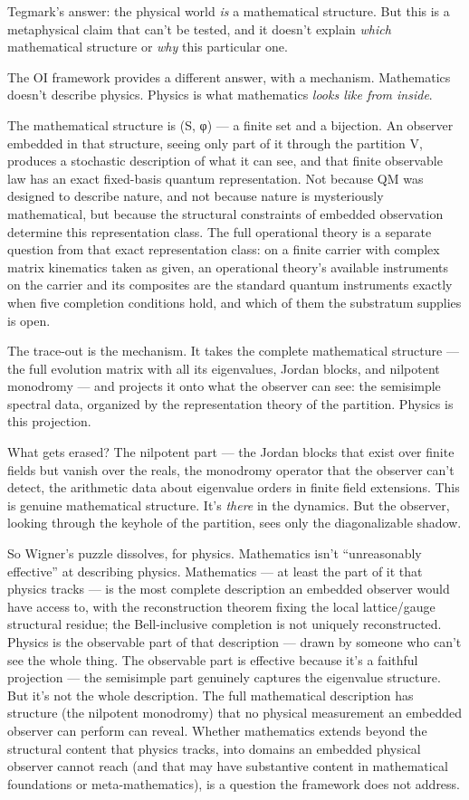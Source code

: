\documentclass[
]{article}
\begin{document}
Tegmark's answer: the physical world \emph{is} a mathematical structure.
But this is a metaphysical claim that can't be tested, and it doesn't
explain \emph{which} mathematical structure or \emph{why} this
particular one.

The OI framework provides a different answer, with a mechanism.
Mathematics doesn't describe physics. Physics is what mathematics
\emph{looks like from inside}.

The mathematical structure is (S, φ) --- a finite set and a bijection.
An observer embedded in that structure, seeing only part of it through
the partition V, produces a stochastic description of what it can see,
and that finite observable law has an exact fixed-basis quantum
representation. Not because QM was designed to describe nature, and not
because nature is mysteriously mathematical, but because the structural
constraints of embedded observation determine this representation class.
The full operational theory is a separate question from that exact
representation class: on a finite carrier with complex matrix kinematics
taken as given, an operational theory's available instruments on the
carrier and its composites are the standard quantum instruments exactly
when five completion conditions hold, and which of them the substratum
supplies is open.

The trace-out is the mechanism. It takes the complete mathematical
structure --- the full evolution matrix with all its eigenvalues, Jordan
blocks, and nilpotent monodromy --- and projects it onto what the
observer can see: the semisimple spectral data, organized by the
representation theory of the partition. Physics is this projection.

What gets erased? The nilpotent part --- the Jordan blocks that exist
over finite fields but vanish over the reals, the monodromy operator
that the observer can't detect, the arithmetic data about eigenvalue
orders in finite field extensions. This is genuine mathematical
structure. It's \emph{there} in the dynamics. But the observer, looking
through the keyhole of the partition, sees only the diagonalizable
shadow.

So Wigner's puzzle dissolves, for physics. Mathematics isn't
``unreasonably effective'' at describing physics. Mathematics --- at
least the part of it that physics tracks --- is the most complete
description an embedded observer would have access to, with the
reconstruction theorem fixing the local lattice/gauge structural
residue; the Bell-inclusive completion is not uniquely reconstructed.
Physics is the observable part of that description --- drawn by someone
who can't see the whole thing. The observable part is effective because
it's a faithful projection --- the semisimple part genuinely captures
the eigenvalue structure. But it's not the whole description. The full
mathematical description has structure (the nilpotent monodromy) that no
physical measurement an embedded observer can perform can reveal.
Whether mathematics extends beyond the structural content that physics
tracks, into domains an embedded physical observer cannot reach (and
that may have substantive content in mathematical foundations or
meta-mathematics), is a question the framework does not address.
\end{document}
